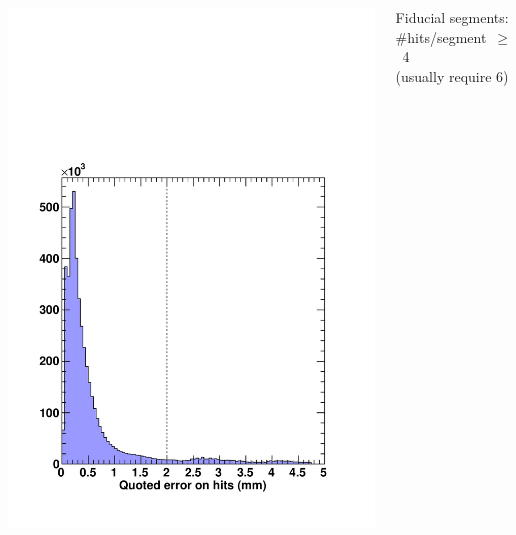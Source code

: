 \documentclass[compress]{beamer}
\begin{document}
\begin{frame}
\begin{columns}
\includegraphics[width=\linewidth]{MCBeamHalo_hit_error.pdf}

Fiducial segments: \\ \mbox{\#hits/segment $\ge$ 4\hspace{-1 cm}} \\ (usually require 6)


\end{columns}
\end{frame}
\end{document}
